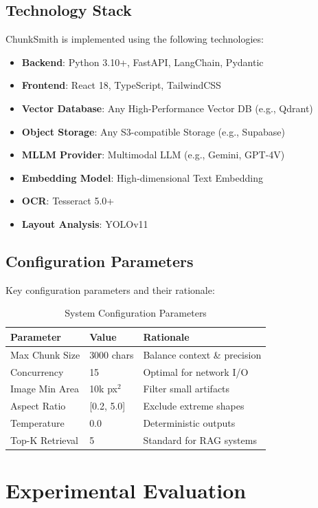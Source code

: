 \documentclass[conference]{IEEEtran}
\begin{document}
\subsection{Technology Stack}
ChunkSmith is implemented using the following technologies:
\begin{itemize}
    \item \textbf{Backend}: Python 3.10+, FastAPI, LangChain, Pydantic
    \item \textbf{Frontend}: React 18, TypeScript, TailwindCSS
    \item \textbf{Vector Database}: Any High-Performance Vector DB (e.g., Qdrant)
    \item \textbf{Object Storage}: Any S3-compatible Storage (e.g., Supabase)
    \item \textbf{MLLM Provider}: Multimodal LLM (e.g., Gemini, GPT-4V)
    \item \textbf{Embedding Model}: High-dimensional Text Embedding
    \item \textbf{OCR}: Tesseract 5.0+
    \item \textbf{Layout Analysis}: YOLOv11
\end{itemize}

\subsection{Configuration Parameters}
Key configuration parameters and their rationale:
\begin{table}[h]
\centering
\caption{System Configuration Parameters}
\begin{tabular}{@{}lll@{}}
\toprule
\textbf{Parameter} & \textbf{Value} & \textbf{Rationale} \\ \midrule
Max Chunk Size & 3000 chars & Balance context \& precision \\
Concurrency & 15 & Optimal for network I/O \\
Image Min Area & 10k px$^2$ & Filter small artifacts \\
Aspect Ratio & [0.2, 5.0] & Exclude extreme shapes \\
Temperature & 0.0 & Deterministic outputs \\
Top-K Retrieval & 5 & Standard for RAG systems \\ \bottomrule
\end{tabular}
\label{tab:config}
\end{table}

\section{Experimental Evaluation}
\end{document}
